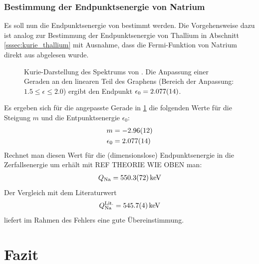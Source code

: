 \documentclass[11pt, a4paper]{article}
\numberwithin{equation}{section}
\begin{document}
\subsubsection{Bestimmung der Endpunktsenergie von Natrium}
Es soll nun die Endpunktsenergie von  bestimmt werden.
Die Vorgehensweise dazu ist analog zur Bestimmung der Endpunktsenergie von Thallium in Abschnitt \ref{sssec:kurie_thallium} mit Ausnahme, dass die Fermi-Funktion von Natrium direkt aus \cite{riezler} abgelesen wurde.
\begin{figure}[h]
	\centering
	
	\caption{Kurie-Darstellung des Spektrums von . Die Anpassung einer Geraden an den linearen Teil des Graphens (Bereich der Anpassung: $\num{1.5} \leq \epsilon \leq {2.0}$) ergibt den Endpunkt $\epsilon_0 = \num{2.077 +- 0.014}$.}
	\label{fig:natrium_kurie}
\end{figure}
Es ergeben sich für die angepasste Gerade in \ref{fig:natrium_kurie} die folgenden Werte für die Steigung $m$ und die Entpunktsenergie $\epsilon_0$:
\begin{align}
	m &= \num{-2.96+- 0.12} \\
	\epsilon_0 &= \num{2.077 +- 0.014}
\end{align}
Rechnet man diesen Wert für die (dimensionslose) Endpunktsenergie in die Zerfallsenergie um erhält mit REF THEORIE WIE OBEN man:
\begin{align}
Q_\mathrm{Na} = \SI{550.3+-7.2}{\kilo\electronvolt}
\end{align}
Der Vergleich mit dem Literaturwert
\begin{align}
	Q^{\mathrm{Lit.}}_\mathrm{Na} = \SI{545.7 +- 0.4}{\kilo\electronvolt}
\end{align}
liefert im Rahmen des Fehlers eine gute Übereinstimmung.

\section{Fazit}
\end{document}
